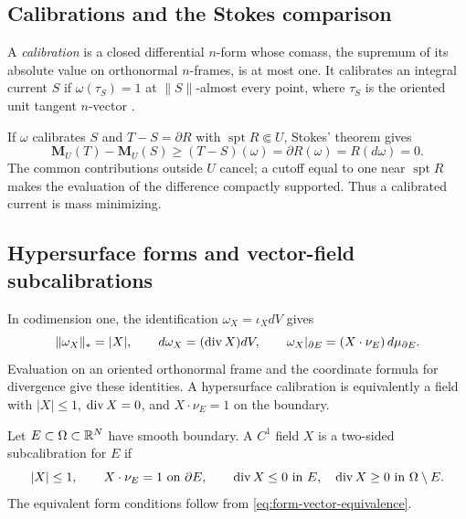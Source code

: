 \subsection{Calibrations and the Stokes comparison}
\label{sec:prelim-calibrations}

A \emph{calibration} is a closed differential \(n\)-form whose
comass, the supremum of its absolute value on orthonormal
\(n\)-frames, is at most one. It calibrates an integral current \(S\) if
\(\omega(\tau_S)=1\) at \(\|S\|\)-almost every point, where \(\tau_S\)
is the oriented unit tangent \(n\)-vector
\cite{HarveyLawson82a}.

If \(\omega\) calibrates \(S\) and \(T-S=\partial R\) with
\(\operatorname{spt}R\Subset U\), Stokes' theorem gives
\begin{equation}\label{eq:calibration-Stokes-comparison}
 \mathbf M_U(T)-\mathbf M_U(S)
 \geq (T-S)(\omega)=\partial R(\omega)=R(d\omega)=0.
\end{equation}
The common contributions outside \(U\) cancel; a cutoff equal to one
near \(\operatorname{spt}R\) makes the evaluation of the difference
compactly supported.  Thus a calibrated current is mass minimizing.

\subsection{Hypersurface forms and vector-field subcalibrations}
\label{sec:prelim-subcalibrations}

In codimension one, the identification \(\omega_X=\iota_XdV\) gives
\begin{equation}\label{eq:form-vector-equivalence}
 \|\omega_X\|_*=|X|,\qquad
 d\omega_X=(\operatorname{div} X)dV,\qquad
 \omega_X|_{\partial E}=(X\cdot\nu_E)\,d\mu_{\partial E}.
\end{equation}
Evaluation on an oriented orthonormal frame and the coordinate
formula for divergence give these identities. A hypersurface
calibration is equivalently a field with \(|X|\leq1\),
\(\operatorname{div} X=0\), and \(X\cdot\nu_E=1\) on the boundary.

\begin{definition}
\label{def:subcalibration}
Let \(E\subset\Omega\subset\mathbb R^N\) have smooth boundary.  A
\(C^1\) field \(X\) is a two-sided subcalibration for \(E\) if
\begin{equation}\label{eq:smooth-subcalibration-signs}
 |X|\leq1,\qquad X\cdot\nu_E=1\text{ on }\partial E,\qquad
 \operatorname{div} X\leq0\text{ in }E,\quad
 \operatorname{div} X\geq0\text{ in }\Omega\setminus E.
\end{equation}
The equivalent form conditions follow from \eqref{eq:form-vector-equivalence}.
\end{definition}


